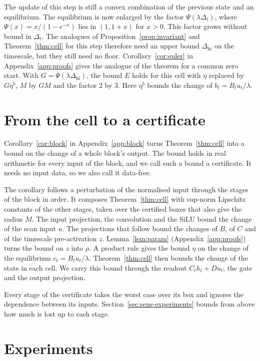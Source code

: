 \documentclass[11pt, a4paper]{article}
\theoremstyle{remark}
\theoremstyle{plain}
\begin{document}
The update of this step is still a convex combination of the previous state and an equilibrium.
The equilibrium is now enlarged by the factor $\Psi(\lambda\Delta_t)$, where
$\Psi(x) = x/(1 - e^{-x})$ lies in $(1, 1 + x)$ for $x > 0$. This factor grows without bound in
$\Delta_t$. The analogues of Proposition~\ref{prop:invariant} and Theorem~\ref{thm:cell} for this
step therefore need an upper bound $\Delta_{\mathrm{hi}}$ on the timescale, but they still need no
floor. Corollary~\ref{cor:euler} in Appendix~\ref{app:proofs} gives the analogue of the theorem for
a common zero start. With $G = \Psi(\lambda\Delta_{\mathrm{hi}})$, the bound $E$ holds for this
cell with $\eta$ replaced by $G\eta^{b}$, $M$ by $GM$ and the factor $2$ by $3$. Here $\eta^{b}$
bounds the change of $b_t = B_t u_t/\lambda$.

\section{From the cell to a certificate}
\label{sec:certificate}

Corollary~\ref{cor:block} in Appendix~\ref{app:block} turns Theorem~\ref{thm:cell} into a bound on
the change of a whole block's output. The bound holds in real arithmetic for every input of the
block, and we call such a bound a certificate. It needs no input data, so we also call it
data-free.

The corollary follows a perturbation of the normalised input through the stages of the block in
order. It composes Theorem~\ref{thm:cell} with sup-norm Lipschitz constants of the other stages,
taken over the certified boxes that also give the radius $M$. The input projection, the
convolution and the SiLU bound the change of the scan input $u$. The projections that follow bound
the changes of $B$, of $C$ and of the timescale pre-activation $z$. Lemma~\ref{lem:param}
(Appendix~\ref{app:proofs}) turns the bound on $z$ into $\rho$. A product rule gives the bound
$\eta$ on the change of the equilibrium $c_t = B_t u_t/\lambda$. Theorem~\ref{thm:cell} then
bounds the change of the state in each cell. We carry this bound through the readout
$C_t h_t + D u_t$, the gate and the output projection.

Every stage of the certificate takes the worst case over its box and ignores the dependence
between its inputs. Section~\ref{sec:sens-experiments} bounds from above how much is lost up to
each stage.

\section{Experiments}
\label{sec:experiments}
\end{document}
